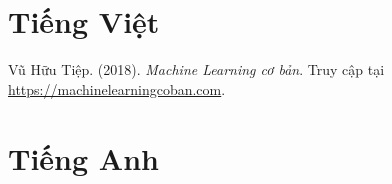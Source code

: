 
\section*{Tiếng Việt}

\begin{enumerate}[series=refs, label={[\arabic*]}, leftmargin=1.27cm]
    \item\label{bib:tiep2018} Vũ Hữu Tiệp. (2018). \textit{Machine Learning cơ bản}. Truy cập tại \url{https://machinelearningcoban.com}.
\end{enumerate}

\section*{Tiếng Anh}

